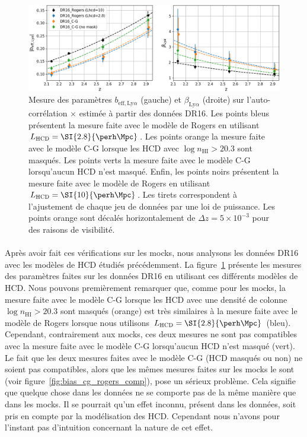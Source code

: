 \begin{figure}
  \centering
  \includegraphics[scale=0.44]{bias_dr16_comp}
  \caption{Mesure des paramètres $b_{\mathrm{eff},\mathrm{Ly}\alpha}$ (gauche) et $\beta_{\mathrm{Ly}\alpha}$ (droite) sur l'auto-corrélation \lya$\times$\lya{} estimée à partir des données DR16. Les points bleus présentent la mesure faite avec le modèle de Rogers en utilisant $L_{\textsc{HCD}} = \SI{2.8}{\perh\Mpc}$. Les points orange la mesure faite avec le modèle C-G lorsque les HCD avec $\log n_{\mathrm{HI}} > \num{20.3}$ sont masqués. Les points verts la mesure faite avec le modèle C-G lorsqu'aucun HCD n'est masqué. Enfin, les points noirs présentent la mesure faite avec le modèle de Rogers en utilisant $L_{\textsc{HCD}} = \SI{10}{\perh\Mpc}$.
      Les tirets correspondent à l'ajustement de chaque jeu de données par une loi de puissance.
Les points orange sont décalés horizontalement de $\Delta z = 5\times10^{-3}$ pour des raisons de visibilité.}
  \label{fig:bias_dr16_comp}
\end{figure}

\paragraph{}
Après avoir fait ces vérifications sur les mocks, nous analysons les données DR16 avec les modèles de HCD étudiés précédemment. La figure~\ref{fig:bias_dr16_comp} présente les mesures des paramètres \lya{} faites sur les données DR16 en utilisant ces différents modèles de HCD.
Nous pouvons premièrement remarquer que, comme pour les mocks, la mesure faite avec le modèle C-G lorsque les HCD avec une densité de colonne $\log n_{\mathrm{HI}} > \num{20.3}$ sont masqués (orange) est très similaires à la mesure faite avec le modèle de Rogers lorsque nous utilisons $L_{\textsc{HCD}} = \SI{2.8}{\perh\Mpc}$ (bleu). Cependant, contrairement aux mocks, ces deux mesures ne sont pas compatibles avec la mesure faite avec le modèle C-G lorsqu'aucun HCD n'est masqué (vert).
Le fait que les deux mesures faites avec le modèle C-G (HCD masqués ou non) ne soient pas compatibles, alors que les mêmes mesures faites sur les mocks le sont (voir figure~\ref{fig:bias_cg_rogers_comp}), pose un sérieux problème. Cela signifie que quelque chose dans les données ne se comporte pas de la même manière que dans les mocks. Il se pourrait qu'un effet inconnu, présent dans les données, soit pris en compte par la modélisation des HCD. Cependant nous n'avons pour l'instant pas d'intuition concernant la nature de cet effet.


